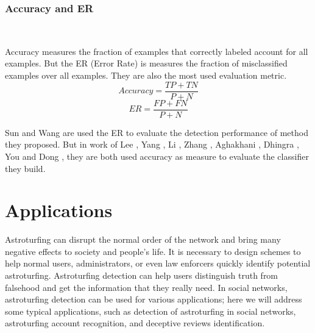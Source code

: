 \documentclass[lettersize,journal]{IEEEtran}
\begin{document}
\subsubsection{Accuracy and ER}
\

Accuracy measures the fraction of examples that correctly labeled account for all examples. But the ER (Error Rate) is measures the fraction of misclassified examples over all examples. They are also the most used evaluation metric.
\[Accuracy = \frac{TP+TN}{P+N}\]
\[ER = \frac{FP+FN}{P+N}\]

 Sun \cite{Sun2013SyntheticRS} and Wang \cite{Wang2014Man} are used the ER to evaluate the detection performance of method they proposed. But in work of Lee \cite{Lee2015CharacterizingAA}, 
	Yang \cite{Yang2015PennyFY}, 
	Li \cite{li2017document}, 
	Zhang \cite{zhang2018dri}, 
	Aghakhani \cite{aghakhani2018detecting}, 
	Dhingra \cite{dhingra2019spam}, 
	You \cite{you2020integrating} and 
	Dong \cite{dong2020opinion}, they are both used accuracy as measure to evaluate the classifier they build.


\section{Applications}
Astroturfing can disrupt the normal order of the network and bring many negative effects to society and people's life. It is necessary to design schemes to help normal users, administrators, or even law enforcers quickly identify potential astroturfing. Astroturfing detection can help users distinguish truth from falsehood and get the information that they really need. In social networks, astroturfing detection can be used for various applications; here we will address some typical applications, such as detection of astroturfing in social networks, astroturfing account recognition, and deceptive reviews identification.
\end{document}
